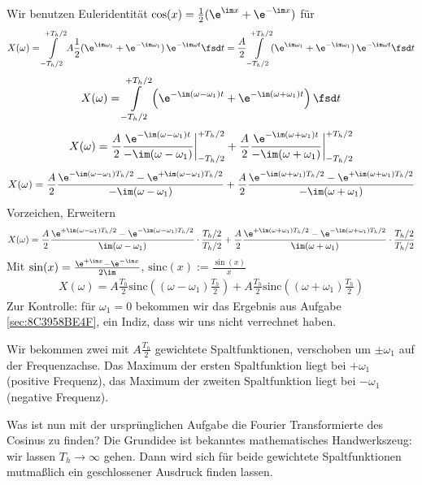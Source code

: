 \begin{ExCalc}
Wir benutzen Euleridentität $\cos(x) = \frac{1}{2}(\e^{\im x} + \e^{-\im x})$ für
\begin{align}
X(\omega) = \int\limits_{-T_h/2}^{+T_h/2} A \frac{1}{2}(\e^{\im \omega_1} + \e^{-\im \omega_1}) \, \e^{-\im \omega t} \fsd t =
\frac{A}{2} \int\limits_{-T_h/2}^{+T_h/2} (\e^{\im \omega_1} + \e^{-\im \omega_1}) \, \e^{-\im \omega t} \fsd t
\end{align}
%
\begin{align}
X(\omega) = \int\limits_{-T_h/2}^{+T_h/2} \left(\e^{-\im (\omega-\omega_1) t} + \e^{-\im (\omega+\omega_1) t} \right) \fsd t
\end{align}
%
\begin{align}
X(\omega) =
\frac{A}{2} \frac{\e^{-\im (\omega-\omega_1) t}}{-\im (\omega-\omega_1)}\bigg|_{-T_h/2}^{+T_h/2}
+\frac{A}{2} \frac{\e^{-\im (\omega+\omega_1) t}}{-\im (\omega+\omega_1)}\bigg|_{-T_h/2}^{+T_h/2}
\end{align}
%
\begin{align}
X(\omega) =
\frac{A}{2} \frac{\e^{-\im (\omega-\omega_1) T_h/2} - \e^{+\im (\omega-\omega_1) T_h/2}}{-\im (\omega-\omega_1)}
+\frac{A}{2} \frac{\e^{-\im (\omega+\omega_1) T_h/2} - \e^{+\im (\omega+\omega_1) T_h/2}}{-\im (\omega+\omega_1)}
\end{align}
%
Vorzeichen, Erweitern
%
\begin{align}
X(\omega) =
\frac{A}{2} \frac{\e^{+\im (\omega-\omega_1) T_h/2} - \e^{-\im (\omega-\omega_1) T_h/2}}{\im (\omega-\omega_1)} \cdot \frac{T_h/2}{T_h/2}
+\frac{A}{2} \frac{\e^{+\im (\omega+\omega_1) T_h/2} - \e^{-\im (\omega+\omega_1) T_h/2}}{\im (\omega+\omega_1)} \cdot \frac{T_h/2}{T_h/2}
\end{align}
%
Mit $\sin(x) = \frac{\e^{+\im x}-\e^{-\im x}}{2\im}$, $\mathrm{sinc}(x):=\frac{\sin (x)}{x}$
\begin{align}
X(\omega) =
A \frac{T_h}{2} \mathrm{sinc}\left((\omega-\omega_1) \frac{T_h}{2}\right) +
A \frac{T_h}{2} \mathrm{sinc}\left((\omega+\omega_1) \frac{T_h}{2}\right)
\end{align}
Zur Kontrolle: für $\omega_1 = 0$ bekommen wir das Ergebnis aus Aufgabe
\ref{sec:8C3958BE4F}, ein Indiz, dass wir uns nicht verrechnet haben.
\end{ExCalc}
%
\begin{Loesung}
Wir bekommen zwei mit $A \frac{T_h}{2}$ gewichtete Spaltfunktionen,
verschoben um $\pm \omega_1$ auf der Frequenzachse. Das Maximum der ersten Spaltfunktion
liegt bei $+\omega_1$ (positive Frequenz), das Maximum der zweiten Spaltfunktion
liegt bei $-\omega_1$ (negative Frequenz).



Was ist nun mit der ursprünglichen Aufgabe die Fourier Transformierte des Cosinus
zu finden?
%
Die Grundidee ist bekanntes mathematisches Handwerkszeug: wir lassen
$T_h\to \infty$ gehen. Dann wird sich für beide gewichtete Spaltfunktionen mutmaßlich ein
geschlossener Ausdruck finden lassen.

\end{Loesung}

